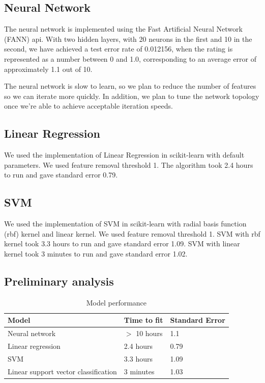 \documentclass[journal]{IEEEtran}
\begin{document}
\subsection{Neural Network}
The neural network is implemented using the Fast Artificial Neural Network (FANN)
api.  With two hidden layers, with 20 neurons in the first and 10 in the second, 
we have achieved a test error rate of 0.012156, when the rating is represented as a
number between 0 and 1.0, corresponding to an average error of approximately 1.1 out of 10.  

The neural network is slow to learn, so we plan to reduce the number of features so we can
iterate more quickly.  In addition, we plan to tune the network topology once we're able
to achieve acceptable iteration speeds.

\subsection{Linear Regression}
We used the implementation of Linear Regression in scikit-learn with default
parameters. We used feature removal threshold 1. The algorithm took 2.4 hours
to run and gave standard error 0.79.

\subsection{SVM}
We used the implementation of SVM in scikit-learn with radial basis function (rbf) kernel and linear kernel. We used feature removal threshold 1. SVM with rbf kernel took 3.3 hours to run and gave standard error 1.09. SVM with linear kernel took 3 minutes to run and gave standard error 1.02.

\subsection*{Preliminary analysis}
\begin{table}[ht]
\caption{Model performance} %
\centering %
\begin{tabular}{l l l} %
\hline\hline
Model               & Time to fit & Standard Error  \\ [0.5ex] %
\hline
Neural network      & $>$ 10 hours  & 1.1 \\
Linear regression   & 2.4 hours   & 0.79 \\
SVM                 & 3.3 hours   & 1.09 \\
Linear support vector classification & 3 minutes & 1.03 \\ [1ex]
\hline %
\end{tabular}
\end{table}
\end{document}

